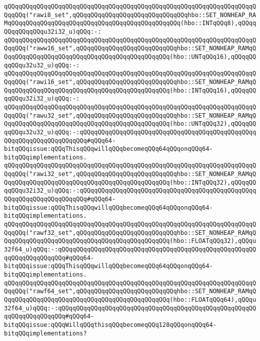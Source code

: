 \verb|qQQqqQQqqQQqqQQqqQQqqQQqqQQqqQQqqQQqqQQqqQQqqQQqqQQqqQQqqQQqqQQqqQQqqQQqqQQq("rawi8_set",qQQqqQQqqQQqqQQqqQQqqQQqqQQqqQQqhbo::SET_NONHEAP_RAMqQQqqQQqqQQqqQQqqQQqqQQqqQQqqQQqqQQqqQQqqQQqqQQq(hbo::INTqQQq8),qQQqqQQqqQQqqQQqu32i32_u)qQQq:-:|\newline
\verb|qQQqqQQqqQQqqQQqqQQqqQQqqQQqqQQqqQQqqQQqqQQqqQQqqQQqqQQqqQQqqQQqqQQqqQQqqQQq("raww16_set",qQQqqQQqqQQqqQQqqQQqqQQqqQQqhbo::SET_NONHEAP_RAMqQQqqQQqqQQqqQQqqQQqqQQqqQQqqQQqqQQqqQQqqQQqqQQq(hbo::UNTqQQq16),qQQqqQQqqQQqu32u32_u)qQQq:-:|\newline
\verb|qQQqqQQqqQQqqQQqqQQqqQQqqQQqqQQqqQQqqQQqqQQqqQQqqQQqqQQqqQQqqQQqqQQqqQQqqQQq("rawi16_set",qQQqqQQqqQQqqQQqqQQqqQQqqQQqhbo::SET_NONHEAP_RAMqQQqqQQqqQQqqQQqqQQqqQQqqQQqqQQqqQQqqQQqqQQqqQQq(hbo::INTqQQq16),qQQqqQQqqQQqu32i32_u)qQQq:-:|\newline
\verb|qQQqqQQqqQQqqQQqqQQqqQQqqQQqqQQqqQQqqQQqqQQqqQQqqQQqqQQqqQQqqQQqqQQqqQQqqQQq("rawu32_set",qQQqqQQqqQQqqQQqqQQqqQQqqQQqhbo::SET_NONHEAP_RAMqQQqqQQqqQQqqQQqqQQqqQQqqQQqqQQqqQQqqQQqqQQqqQQq(hbo::UNTqQQq32),qQQqqQQqqQQqu32u32_u)qQQq:-:qQQqqQQqqQQqqQQqqQQqqQQqqQQqqQQqqQQqqQQqqQQqqQQqqQQqqQQqqQQqqQQqqQQqqQQq#qQQq64-bitqQQqissue:qQQqThisqQQqwillqQQqbecomeqQQq64qQQqonqQQq64-bitqQQqimplementations.|\newline
\verb|qQQqqQQqqQQqqQQqqQQqqQQqqQQqqQQqqQQqqQQqqQQqqQQqqQQqqQQqqQQqqQQqqQQqqQQqqQQq("rawi32_set",qQQqqQQqqQQqqQQqqQQqqQQqqQQqhbo::SET_NONHEAP_RAMqQQqqQQqqQQqqQQqqQQqqQQqqQQqqQQqqQQqqQQqqQQqqQQq(hbo::INTqQQq32),qQQqqQQqqQQqu32i32_u)qQQq:-:qQQqqQQqqQQqqQQqqQQqqQQqqQQqqQQqqQQqqQQqqQQqqQQqqQQqqQQqqQQqqQQqqQQqqQQq#qQQq64-bitqQQqissue:qQQqThisqQQqwillqQQqbecomeqQQq64qQQqonqQQq64-bitqQQqimplementations.|\newline
\verb|qQQqqQQqqQQqqQQqqQQqqQQqqQQqqQQqqQQqqQQqqQQqqQQqqQQqqQQqqQQqqQQqqQQqqQQqqQQq("rawf32_set",qQQqqQQqqQQqqQQqqQQqqQQqqQQqhbo::SET_NONHEAP_RAMqQQqqQQqqQQqqQQqqQQqqQQqqQQqqQQqqQQqqQQqqQQqqQQq(hbo::FLOATqQQq32),qQQqu32f64_u)qQQq:-:qQQqqQQqqQQqqQQqqQQqqQQqqQQqqQQqqQQqqQQqqQQqqQQqqQQqqQQqqQQqqQQqqQQqqQQq#qQQq64-bitqQQqissue:qQQqThisqQQqwillqQQqbecomeqQQq64qQQqonqQQq64-bitqQQqimplementations.|\newline
\verb|qQQqqQQqqQQqqQQqqQQqqQQqqQQqqQQqqQQqqQQqqQQqqQQqqQQqqQQqqQQqqQQqqQQqqQQqqQQq("rawf64_set",qQQqqQQqqQQqqQQqqQQqqQQqqQQqhbo::SET_NONHEAP_RAMqQQqqQQqqQQqqQQqqQQqqQQqqQQqqQQqqQQqqQQqqQQqqQQq(hbo::FLOATqQQq64),qQQqu32f64_u)qQQq:-:qQQqqQQqqQQqqQQqqQQqqQQqqQQqqQQqqQQqqQQqqQQqqQQqqQQqqQQqqQQqqQQqqQQqqQQq#qQQq64-bitqQQqissue:qQQqWillqQQqthisqQQqbecomeqQQq128qQQqonqQQq64-bitqQQqimplementations?|\newline
